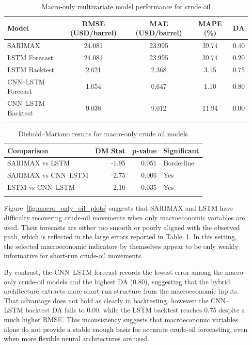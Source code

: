\documentclass[pdflatex,sn-mathphys-num]{sn-jnl}%
\theoremstyle{thmstyleone}%
\theoremstyle{thmstyletwo}%
\theoremstyle{thmstylethree}%
\begin{document}
\begin{table}[h]
\centering
\caption{Macro-only multivariate model performance for crude oil}
\label{tab:macro_only_oil}
\begin{tabular}{@{}lcccc@{}}
\toprule
Model & RMSE (USD/barrel) & MAE (USD/barrel) & MAPE (\%) & DA \\
\midrule
SARIMAX & 24.081 & 23.995 & 39.74 & 0.40 \\
LSTM Forecast & 24.081 & 23.995 & 39.74 & 0.20 \\
LSTM Backtest & 2.621 & 2.368 & 3.15 & 0.75 \\
CNN--LSTM Forecast & 1.054 & 0.647 & 1.10 & 0.80 \\
CNN--LSTM Backtest & 9.038 & 9.012 & 11.94 & 0.00 \\
\botrule
\end{tabular}
\end{table}

\begin{table}[h]
\centering
\small
\caption{Diebold--Mariano results for macro-only crude oil models}
\label{tab:dm_macro_oil}
\begin{tabular}{@{}lrrl@{}}
\toprule
Comparison & DM Stat & p-value & Significant \\
\midrule
SARIMAX vs LSTM & -1.95 & 0.051 & Borderline \\
SARIMAX vs CNN--LSTM & -2.75 & 0.006 & Yes \\
LSTM vs CNN--LSTM & -2.10 & 0.035 & Yes \\
\botrule
\end{tabular}
\end{table}

Figure~\ref{fig:macro_only_oil_plots} suggests that SARIMAX and LSTM have difficulty recovering crude-oil movements when only macroeconomic variables are used. Their forecasts are either too smooth or poorly aligned with the observed path, which is reflected in the large errors reported in Table~\ref{tab:macro_only_oil}. In this setting, the selected macroeconomic indicators by themselves appear to be only weakly informative for short-run crude-oil movements.

By contrast, the CNN--LSTM forecast records the lowest error among the macro-only crude-oil models and the highest DA (0.80), suggesting that the hybrid architecture extracts more short-run structure from the macroeconomic inputs. That advantage does not hold as clearly in backtesting, however: the CNN--LSTM backtest DA falls to 0.00, while the LSTM backtest reaches 0.75 despite a much higher RMSE. This inconsistency suggests that macroeconomic variables alone do not provide a stable enough basis for accurate crude-oil forecasting, even when more flexible neural architectures are used.
\end{document}
